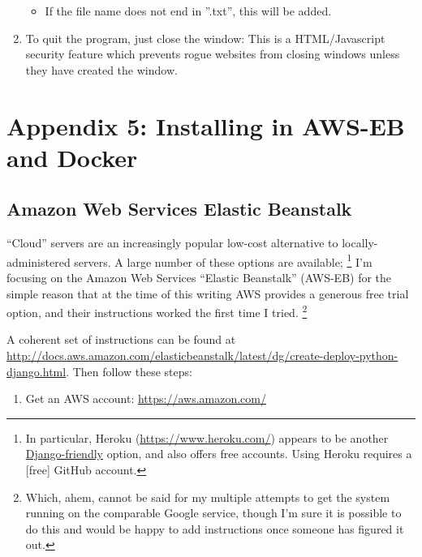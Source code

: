 \documentclass[letterpaper,10pt,english]{sphinxmanual}
\begin{document}
\begin{enumerate}
\begin{itemize}
\item {} 
If the file name does not end in ''.txt'', this will be
added.

\end{itemize}

\item {} 
To quit the program, just close the window: This is a HTML/Javascript security feature which
prevents rogue websites from closing windows unless they have created
the window.

\end{enumerate}


\chapter{Appendix 5: Installing in AWS-EB and Docker}
\label{appendix5:appendix-5-installing-in-aws-eb-and-docker}\label{appendix5::doc}

\section{Amazon Web Services Elastic Beanstalk}
\label{appendix5:amazon-web-services-elastic-beanstalk}
“Cloud” servers are an increasingly popular low-cost alternative to locally-administered servers. A large number of these
options are available; \footnote{
In particular, Heroku (\href{https://www.heroku.com/}{https://www.heroku.com/}) appears to be another
\href{https://devcenter.heroku.com/articles/getting-started-with-django}{Django-friendly} option, and also offers free accounts.
Using Heroku requires a {[}free{]} GitHub account.
} I'm focusing on the Amazon Web Services “Elastic Beanstalk” (AWS-EB) for the simple reason that at the time
of this writing AWS provides a generous free trial option, and their instructions worked the first time I tried. \footnote{
Which, ahem, cannot be said for my multiple attempts to get the system running on the comparable Google service,
though I'm sure it is possible to do this and would be happy to add instructions once someone has figured it
out.
}

A coherent set of instructions can be found at
\href{http://docs.aws.amazon.com/elasticbeanstalk/latest/dg/create-deploy-python-django.html}{http://docs.aws.amazon.com/elasticbeanstalk/latest/dg/create-deploy-python-django.html}. Then follow these steps:
\begin{enumerate}
\item {} 
Get an AWS account: \href{https://aws.amazon.com/}{https://aws.amazon.com/}

\end{enumerate}
\end{document}
